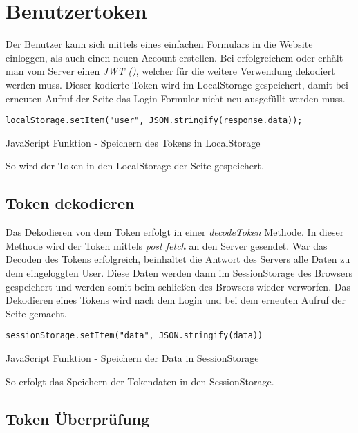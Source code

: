 \section{Benutzertoken}
\label{benutzer}

Der Benutzer kann sich mittels eines einfachen Formulars in die Website einloggen, als auch einen neuen 
Account erstellen. Bei erfolgreichem \underline{} oder \underline{} erhält man vom Server einen 
\textit{JWT (\underline{})}, welcher für die weitere Verwendung dekodiert werden muss. Dieser kodierte 
Token wird im LocalStorage gespeichert, damit bei erneuten Aufruf der Seite das Login-Formular nicht neu 
ausgefüllt werden muss.
\begin{code}[htp]
\begin{lstlisting}
localStorage.setItem("user", JSON.stringify(response.data));
\end{lstlisting}
\caption{JavaScript Funktion - Speichern des Tokens in LocalStorage}
\end{code}
So wird der Token in den LocalStorage der Seite gespeichert.
\subsection{Token dekodieren}

Das Dekodieren von dem Token erfolgt in einer \textit{decodeToken} Methode. In dieser Methode wird der 
Token mittels \textit{post fetch} an den Server gesendet. War das Decoden des Tokens erfolgreich, 
beinhaltet die Antwort des Servers alle Daten zu dem eingeloggten User. Diese Daten werden dann im 
SessionStorage des Browsers gespeichert und werden somit beim schließen des Browsers wieder verworfen. 
Das Dekodieren eines Tokens wird nach dem Login und bei dem erneuten Aufruf der Seite gemacht.
\begin{code}[htp]
\begin{lstlisting}
sessionStorage.setItem("data", JSON.stringify(data))
\end{lstlisting}
\caption{JavaScript Funktion - Speichern der Data in SessionStorage}
\end{code}

So erfolgt das Speichern der Tokendaten in den SessionStorage.

\subsection{Token Überprüfung}

